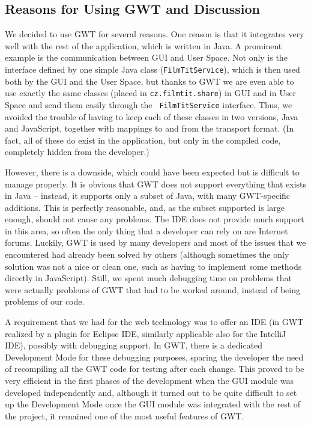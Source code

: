 \subsection{Reasons for Using GWT and Discussion}
\label{sec:reasonsForGWT}

We decided to use GWT for several reasons.
One reason is that it integrates very well with the rest of the 
application, which is written in Java. A prominent example is the 
communication between GUI and User Space. Not only is the interface 
defined by one simple Java class ({\tt FilmTitService}), which is then 
used both by the GUI and the User Space, but thanks to GWT we are even 
able to use exactly the same classes (placed in {\tt cz.filmtit.share}) 
in GUI and in User Space and send them easily through the {\tt 
FilmTitService} interface. Thus, we avoided the trouble of having to keep 
each of these classes in two versions, Java and JavaScript, together with 
mappings to and from the transport format. (In fact, all of these do 
exist in the application, but only in the compiled code, completely 
hidden from the developer.)

However, there is a downside, which could have been expected but is 
difficult to manage properly. It is obvious that GWT does not support 
everything that exists in Java -- instead, it supports only a subset of 
Java, with many GWT-specific additions. This is perfectly reasonable, 
and, as the subset supported is large enough, should not cause any 
problems. The IDE does not provide much support in this area, so often the only thing 
that a developer can rely on are Internet forums. Luckily, GWT is used by 
many developers and most of the issues that we encountered had already 
been solved by others (although sometimes the only solution was not a 
nice or clean one, such as having to implement some methods directly in 
JavaScript). Still, we spent much debugging time on problems that were actually problems of GWT that had to be worked around, instead of being problems of our code.

A requirement that we had for the web technology was to offer an IDE (in GWT realized by a plugin for Eclipse IDE, similarly applicable also for the IntelliJ IDE), possibly with debugging support. In GWT, there is a dedicated Development Mode for these debugging purposes, sparing the developer the need of recompiling all the GWT code for testing after each change. This proved to be very efficient in the first phases of the development when the GUI module was developed independently and, although it turned out to be quite difficult to set up the Development Mode once the GUI module was integrated with the rest of the project, it remained one of the most useful features of GWT.


